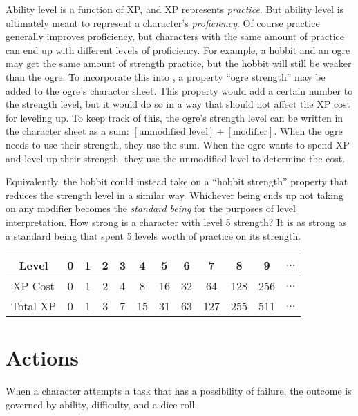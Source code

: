 Ability level is a function of XP, and XP represents \emph{practice}.
But ability level is ultimately meant to represent a character's \emph{proficiency}.
Of course practice generally improves proficiency, but characters with the same amount of practice can end up with different levels of proficiency.
For example, a hobbit and an ogre may get the same amount of strength practice, but the hobbit will still be weaker than the ogre.
To incorporate this into \peupfudge{}, a property ``ogre strength'' may be added to the ogre’s character sheet.
This property would add a certain number to the strength level, but it would do so in a way that should not affect the XP cost for leveling up.
To keep track of this, the ogre’s strength level can be written in the character sheet as a sum: 
$[\textrm{unmodified level}] + [\textrm{modifier}]$.
When the ogre needs to use their strength, they use the sum.
When the ogre wants to spend XP and level up their strength, they use the unmodified level to determine the cost.

Equivalently, the hobbit could instead take on a ``hobbit strength'' property that reduces the strength level in a similar way.
Whichever being ends up not taking on any modifier becomes the \emph{standard being} for the purposes of level interpretation.
How strong is a character with level 5 strength?
It is as strong as a standard being that spent 5 levels worth of practice on its strength.

\begin{center}
\begin{tabular}{|c|c|c|c|c|c|c|c|c|c|c|c|}
\hline
Level    & 0 & 1 & 2 & 3 & 4  & 5  & 6  & 7   & 8   & 9   & $\ldots$ \\ \hline
XP Cost  & 0 & 1 & 2 & 4 & 8  & 16 & 32 & 64  & 128 & 256 & $\ldots$ \\ \hline
Total XP & 0 & 1 & 3 & 7 & 15 & 31 & 63 & 127 & 255 & 511 & $\ldots$ \\ \hline
\end{tabular}
\end{center}


\section{Actions}
When a character attempts a task that has a possibility of failure, the outcome is governed by ability, difficulty, and a dice roll. 

